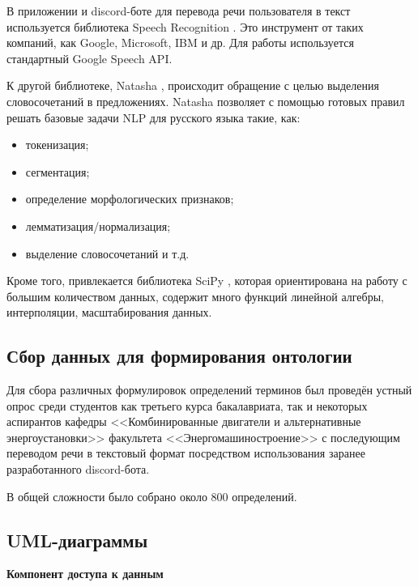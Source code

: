 В приложении и discord-боте для перевода речи пользователя в текст используется библиотека Speech Recognition \cite{speech_rec}. Это инструмент от таких компаний, как Google, Microsoft, IBM и др. Для работы используется стандартный Google Speech API.

К другой библиотеке, Natasha \cite{natasha}, происходит обращение с целью выделения словосочетаний в предложениях. Natasha позволяет  с помощью готовых правил решать базовые задачи NLP для русского языка такие, как:
\begin{itemize}
	\item токенизация;
	\item сегментация;
	\item определение морфологических признаков;
	\item лемматизация/нормализация;
	\item выделение словосочетаний и т.д.
\end{itemize}

Кроме того, привлекается библиотека SciPy \cite{scipy}, которая ориентирована на работу с большим количеством данных, содержит много функций линейной алгебры, интерполяции, масштабирования данных. \newline

\subsection{Сбор данных для формирования онтологии}
Для сбора различных формулировок определений терминов был проведён устный опрос среди студентов как третьего курса бакалавриата, так и некоторых аспирантов кафедры <<Комбинированные двигатели и альтернативные энергоустановки>> факультета <<Энергомашиностроение>> с последующим переводом речи в текстовый формат посредством использования заранее разработанного discord-бота.

В общей сложности было собрано около 800 определений. \newline

\subsection{UML-диаграммы}
\textbf{Компонент доступа к данным}

